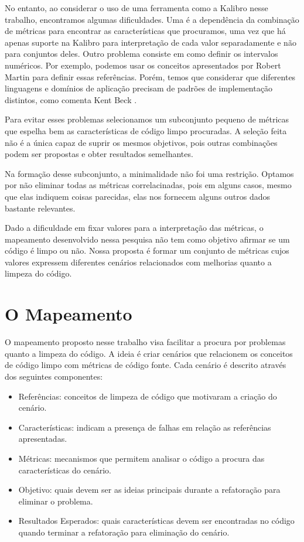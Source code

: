 	No entanto, ao considerar o uso de uma ferramenta como a Kalibro nesse trabalho, encontramos algumas dificuldades. Uma é a dependência da combinação de métricas para encontrar as características que procuramos, uma vez que há apenas suporte na Kalibro para interpretação de cada valor separadamente e não para conjuntos deles. Outro problema consiste em como definir os intervalos numéricos. Por exemplo, podemos usar os conceitos apresentados por Robert Martin \citep{Martin2008} para definir essas referências. Porém, temos que considerar que diferentes linguagens e domínios de aplicação precisam de padrões de implementação distintos, como comenta Kent Beck \citep{Beck2007}.	
	
	Para evitar esses problemas selecionamos um subconjunto pequeno de métricas que espelha bem as características de código limpo procuradas. A seleção feita não é a única capaz de suprir os mesmos objetivos, pois outras combinações podem ser propostas e obter resultados semelhantes.
		
	Na formação desse subconjunto, a minimalidade não foi uma restrição. Optamos por não eliminar todas as métricas correlacinadas, pois em alguns casos, mesmo que elas indiquem coisas parecidas, elas nos fornecem alguns outros dados bastante relevantes.
	
	Dado a dificuldade em fixar valores para a interpretação das métricas, o mapeamento desenvolvido nessa pesquisa não tem como objetivo afirmar se um código é limpo ou não. Nossa proposta é formar um conjunto de métricas cujos valores expressem diferentes cenários relacionados com melhorias quanto a limpeza do código.
	
	
\section{O Mapeamento}

	O mapeamento proposto nesse trabalho visa facilitar a procura por problemas quanto a limpeza do código. A ideia é criar cenários que relacionem os conceitos de código limpo com métricas de código fonte. Cada cenário é descrito através dos seguintes componentes:
	
\begin{itemize}
	\item Referências: conceitos de limpeza de código que motivaram a criação do cenário.
	\item Características: indicam a presença de falhas em relação as referências apresentadas.
	\item Métricas: mecanismos que permitem analisar o código a procura das características do cenário.
	\item Objetivo: quais devem ser as ideias principais durante a refatoração para eliminar o problema.
	\item Resultados Esperados: quais características devem ser encontradas no código quando terminar a refatoração para eliminação do cenário.
\end{itemize}	

